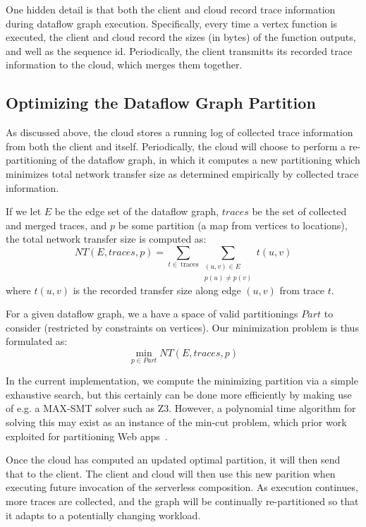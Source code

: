 \documentclass[10pt,sigplan,screen,nonacm]{acmart}
\begin{document}
One hidden detail is that both the client and cloud record trace information
during dataflow graph execution. Specifically, every time a vertex function
is executed, the client and cloud record the sizes (in bytes) of the function
outputs, and well as the sequence id. Periodically, the client transmitts
its recorded trace information to the cloud, which merges them together.

\subsection{Optimizing the Dataflow Graph Partition}
\label{section:dag-optimization}

As discussed above, the cloud stores a running log of collected trace information
from both the client and itself. Periodically, the cloud will choose to perform
a re-partitioning of the dataflow graph, in which it computes a new
partitioning which minimizes total network transfer size as determined empirically
by collected trace information. 

If we let $E$ be the edge set of the dataflow graph,
$\mathit{traces}$ be the set of collected and merged traces,
and $p$ be some partition (a map from vertices to locations), 
the total network transfer size is computed as:
\[
	NT(E, \mathit{traces}, p) = \sum_{t \in~\text{traces}}
	\sum_{
		\substack{
			(u, v) \in E\\
			p(u) \neq p(v)}}
	t(u, v)
\]
where $t(u, v)$ is the recorded transfer size along edge $(u, v)$ from
trace $t$.

For a given dataflow graph, we a have a space of valid 
partitionings $\mathit{Part}$ to consider (restricted by constraints on vertices).
Our minimization problem is thus formulated as:
\[
	\min_{p \in \mathit{Part}} NT(E, \mathit{traces}, p)
\]

In the current implementation, we compute the minimizing partition via
a simple exhaustive search, but this certainly can be done more efficiently
by making use of e.g. a MAX-SMT solver such as Z3. However, a polynomial
time algorithm for solving this may exist as an instance of the min-cut problem,
which prior work exploited for partitioning Web apps~\cite{chong:swift}.

Once the cloud has computed an updated optimal partition, it will then send
that to the client. The client and cloud will then use this new parition
when executing future invocation of the serverless composition.
As execution continues, more traces are collected, and the graph
will be continually re-partitioned so that it adapts to a potentially
changing workload.
\end{document}
